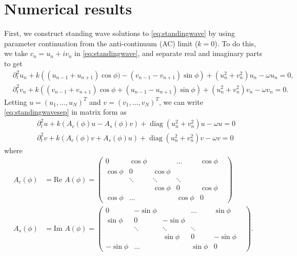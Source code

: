\documentclass[11pt,reqno]{amsart}
\DeclareMathOperator{\diag}{diag}
\begin{document}
\section{Numerical results}\label{sec:numerics}

First, we construct standing wave solutions to \cref{eq:standingwave} by using parameter continuation from the anti-continuum (AC) limit ($k=0$). To do this, we take $c_n = u_n + i v_n$ in \cref{eq:standingwave}, and separate real and imaginary parts to get
\begin{equation}\label{eq:standingwavesep}
\begin{aligned}
&\partial_t^2 u_n + k\left( (u_{n-1} + u_{n+1}) \cos \phi ) - (v_{n-1} - v_{n+1})\sin \phi \right) + (u_n^2+v_n^2) u_n - \omega u_n= 0, \\
&\partial_t^2 v_n + k\left( (v_{n-1} + v_{n+1} ) \cos \phi + (u_{n-1}- u_{n+1})\sin \phi \right) +(u_n^2+v_n^2) v_n - \omega v_n = 0.
\end{aligned}
\end{equation}
Letting $u = (u_1, \dots, u_N)^T$ and $v = (v_1, \dots, v_N)^T$, we can write \cref{eq:standingwavesep} in matrix form as 
\begin{equation}\label{eq:standingwavematrixsep}
\begin{aligned}
&\partial_t^2 u + k (A_c(\phi) u - A_s(\phi) v) + \diag\left(u_n^2 + v_n^2 \right)u - \omega u = 0 \\
&\partial_t^2 v + k (A_c(\phi) v + A_s(\phi) u) + \diag\left(u_n^2 + v_n^2 \right)v - \omega v = 0
\end{aligned}
\end{equation}
where
\begin{align*}
A_c(\phi) &= \text{Re } A(\phi) = \begin{pmatrix}
0 & \cos \phi & & \dots & \cos \phi \\
\cos \phi & 0 & \cos \phi & & & \\
& \ddots & \ddots & \ddots &  & \\
 & &\cos \phi  & 0 & \cos \phi  \\
\cos \phi& \dots & & \cos \phi & 0
\end{pmatrix} \\
A_s(\phi) &= \text{Im } A(\phi) = \begin{pmatrix}
0 & -\sin \phi & & \dots & \sin \phi \\
\sin \phi & 0 & -\sin \phi & & & \\
& \ddots & \ddots & \ddots &  & \\
 & &\sin \phi  & 0 & -\sin \phi  \\
-\sin \phi& \dots & & \sin \phi & 0
\end{pmatrix}.
\end{align*}
\end{document}
